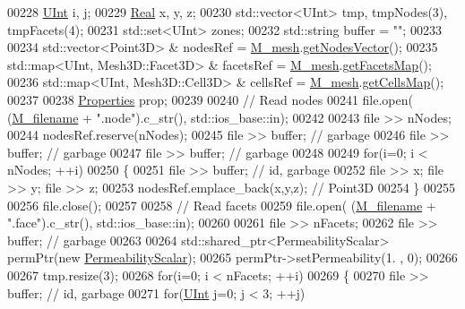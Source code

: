 \begin{DoxyCode}
00228     \hyperlink{namespaceFVCode3D_a4bf7e328c75d0fd504050d040ebe9eda}{UInt} i, j;
00229     \hyperlink{namespaceFVCode3D_a40c1f5588a248569d80aa5f867080e83}{Real} x, y, z;
00230     std::vector<UInt> tmp, tmpNodes(3), tmpFacets(4);
00231     std::set<UInt> zones;
00232     std::string buffer = \textcolor{stringliteral}{""};
00233 
00234     std::vector<Point3D> & nodesRef = \hyperlink{classFVCode3D_1_1Importer_a6f1542d6c6ac192e36c8eec7dc366653}{M\_mesh}.\hyperlink{classFVCode3D_1_1Mesh3D_a04162ec60e0fe52674b3ecbb7de1185c}{getNodesVector}();
00235     std::map<UInt, Mesh3D::Facet3D> & facetsRef = \hyperlink{classFVCode3D_1_1Importer_a6f1542d6c6ac192e36c8eec7dc366653}{M\_mesh}.\hyperlink{classFVCode3D_1_1Mesh3D_a76de387da2a552e3e1210d795bc7acf9}{getFacetsMap}();
00236     std::map<UInt, Mesh3D::Cell3D> & cellsRef = \hyperlink{classFVCode3D_1_1Importer_a6f1542d6c6ac192e36c8eec7dc366653}{M\_mesh}.\hyperlink{classFVCode3D_1_1Mesh3D_ad904ef5e068c89951d77e9364e960bf3}{getCellsMap}();
00237 
00238     \hyperlink{classFVCode3D_1_1Properties}{Properties} prop;
00239 
00240     \textcolor{comment}{// Read nodes}
00241     file.open( (\hyperlink{classFVCode3D_1_1Importer_a318e689fb93c5c906f85aa13685724d7}{M\_filename} + \textcolor{stringliteral}{".node"}).c\_str(), std::ios\_base::in);
00242 
00243     file >> nNodes;
00244     nodesRef.reserve(nNodes);
00245     file >> buffer; \textcolor{comment}{// garbage}
00246     file >> buffer; \textcolor{comment}{// garbage}
00247     file >> buffer; \textcolor{comment}{// garbage}
00248 
00249     \textcolor{keywordflow}{for}(i=0; i < nNodes; ++i)
00250     \{
00251         file >> buffer; \textcolor{comment}{// id, garbage}
00252         file >> x; file >> y; file >> z;
00253         nodesRef.emplace\_back(x,y,z); \textcolor{comment}{// Point3D}
00254     \}
00255 
00256     file.close();
00257 
00258     \textcolor{comment}{// Read facets}
00259     file.open( (\hyperlink{classFVCode3D_1_1Importer_a318e689fb93c5c906f85aa13685724d7}{M\_filename} + \textcolor{stringliteral}{".face"}).c\_str(), std::ios\_base::in);
00260 
00261     file >> nFacets;
00262     file >> buffer; \textcolor{comment}{// garbage}
00263 
00264     std::shared\_ptr<PermeabilityScalar> permPtr(\textcolor{keyword}{new} \hyperlink{classFVCode3D_1_1PermeabilityScalar}{PermeabilityScalar});
00265     permPtr->setPermeability(1. , 0);
00266 
00267     tmp.resize(3);
00268     \textcolor{keywordflow}{for}(i=0; i < nFacets; ++i)
00269     \{
00270         file >> buffer; \textcolor{comment}{// id, garbage}
00271         \textcolor{keywordflow}{for}(\hyperlink{namespaceFVCode3D_a4bf7e328c75d0fd504050d040ebe9eda}{UInt} j=0; j < 3; ++j)

\end{DoxyCode}
